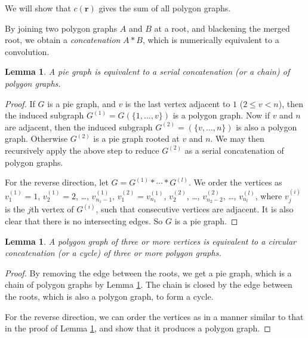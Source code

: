 \documentclass[aip,jcp,reprint,superscriptaddress]{revtex4-1}
\newtheorem{lemm}[thrm]{Lemma}
\newcommand{\vct}[1]{\mathbf{#1}}
\providecommand{\vr}{} %
\renewcommand{\vr}{\vct{r}}
\begin{document}
We will show that $c(\vr)$ gives the sum of all polygon graphs.

By joining two polygon graphs $A$ and $B$ at a root,
  and blackening the merged root,
  we obtain a \emph{concatenation} $A*B$,
  which is numerically equivalent to a convolution.

\begin{lemm}
A pie graph is equivalent to
  a serial concatenation (or a \emph{chain})
  of polygon graphs.
\label{thm:pycat}
\end{lemm}

\begin{proof}
If $G$ is a pie graph,
  and $v$ is the last vertex adjacent to $1$ ($2 \le v < n$),
  then the induced subgraph $G^{(1)} = G(\{1, \dots, v\})$
  is a polygon graph.
%
Now if $v$ and $n$ are adjacent, then
  the induced subgraph $G^{(2)} = (\{v, \dots, n\})$
  is also a polygon graph.
%
Otherwise $G^{(2)}$ is a pie graph
  rooted at $v$ and $n$.
%
We may then recursively apply the above step
  to reduce $G^{(2)}$
  as a serial concatenation of polygon graphs.

For the reverse direction,
  let $G=G^{(1)}*\cdots*G^{(l)}$.
%
We order the vertices as
  $v^{(1)}_1 = 1$,
  $v^{(1)}_2 = 2$,
  \dots,
  $v^{(1)}_{n_1 - 1}$, %
  $v^{(2)}_1 = v^{(1)}_{n_1}$,
  $v^{(2)}_2$,
  \dots,
  $v^{(2)}_{n_2 - 2}$, %
  \dots,
  $v^{(l)}_{n_l}$,
%
where $v^{(i)}_j$ is the $j$th vertex of $G^{(i)}$,
  such that consecutive vertices are adjacent.
%
It is also clear that there is no intersecting edges.
%
So $G$ is a pie graph.
\end{proof}



\begin{lemm}
A polygon graph of three or more vertices
  is equivalent to
  a circular concatenation (or a \emph{cycle})
  of three or more polygon graphs.
\label{thm:pycatc}
\end{lemm}

\begin{proof}
By removing the edge between the roots,
  we get a pie graph,
  which is a chain of polygon graphs
  by Lemma \ref{thm:pycat}.
%
The chain is closed by the edge between the roots,
  which is also a polygon graph,
  to form a cycle.

For the reverse direction,
  we can order the vertices as in a manner similar to
  that in the proof of Lemma \ref{thm:pycat},
  and show that it produces a polygon graph.
\end{proof}
\end{document}
